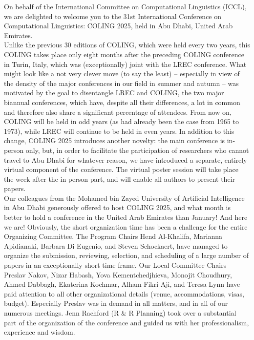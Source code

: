 On behalf of the International Committee on Computational Linguistics (ICCL), we are delighted to welcome you to the 31st International Conference on Computational Linguistics: COLING 2025, held in Abu Dhabi, United Arab Emirates.\\

Unlike the previous 30 editions of COLING, which were held every two years, this COLING takes place only eight months after the preceding COLING conference in Turin, Italy, which was (exceptionally) joint with the LREC conference. What might look like a not very clever move (to say the least) – especially in view of the density of the major conferences in our field in summer and autumn – was motivated by the goal to disentangle LREC and COLING, the two major  biannual conferences, which have, despite all their differences, a lot in common and therefore also share a significant percentage of attendees.  From now on, COLING will be held in odd years (as had already been the case from 1965 to 1973), while LREC will continue to be held in even years. In addition to this change, COLING 2025 introduces another novelty: the main conference is in-person only, but, in order to facilitate the participation of researchers who cannot travel to Abu Dhabi for whatever reason, we have introduced a separate, entirely virtual component of the conference. The virtual poster session will take place the week after the in-person part, and will enable all authors to present their papers.\\

Our colleagues from the Mohamed bin Zayed University of Artificial Intelligence in Abu Dhabi generously offered to host COLING 2025, and what month is better to hold a conference in the United Arab Emirates than January! And here we are! Obviously, the short organization time has been a challenge for the entire Organizing Committee.  The Program Chairs Hend Al-Khalifa, Marianna Apidianaki, Barbara Di Eugenio, and Steven Schockaert, have managed to organize the submission, reviewing, selection, and scheduling of a large number of papers in an exceptionally short time frame. Our Local Committee Chairs Preslav Nakov, Nizar Habash, Yova Kementchedjhieva, Monojit Choudhury, Ahmed Dabbagh, Ekaterina Kochmar, Alham Fikri Aji, and Teresa Lynn have paid attention to all other organizational details (venue, accommodations, visas, budget). Especially Preslav was in demand in all matters, and in all of our numerous meetings. Jenn Rachford (R \& R Planning) took over a substantial part of the organization of the conference and guided us with her professionalism, experience and wisdom. \\

